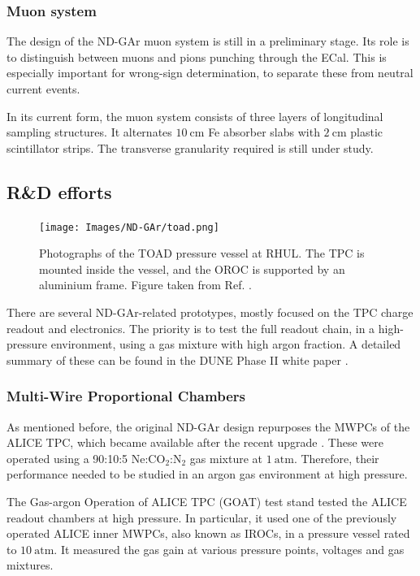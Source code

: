 \subsubsection{Muon system}

The design of the ND-GAr muon system is still in a preliminary stage. Its role is to distinguish between muons and pions punching through the ECal. This is especially important for wrong-sign determination, to separate these from neutral current events.

In its current form, the muon system consists of three layers of longitudinal sampling structures. It alternates $10~\mathrm{cm}$ Fe absorber slabs with $2~\mathrm{cm}$ plastic scintillator strips. The transverse granularity required is still under study.

\subsection{R\&D efforts}

\begin{figure}[t]
	\centering
	\texttt{[image: Images/ND-GAr/toad.png]}
	\caption[Photographs of the TOAD pressure vessel at RHUL.]{Photographs of the TOAD pressure vessel at RHUL. The TPC is mounted inside the vessel, and the OROC is supported by an aluminium frame. Figure taken from Ref. \cite{Ritchie-Yates2023}.}
	\label{fig:toad}
\end{figure}

There are several ND-GAr-related prototypes, mostly focused on the TPC charge readout and electronics. The priority is to test the full readout chain, in a high-pressure environment, using a gas mixture with high argon fraction. A detailed summary of these can be found in the DUNE Phase II white paper \cite{DUNE2024Phase2}.

\subsubsection{Multi-Wire Proportional Chambers}

As mentioned before, the original ND-GAr design repurposes the MWPCs of the ALICE TPC, which became available after the recent upgrade \cite{ALICETPC2020}. These were operated using a 90:10:5 $\mathrm{Ne}$:$\mathrm{CO}_{2}$:$\mathrm{N}_{2}$ gas mixture at $1~\mathrm{atm}$. Therefore, their performance needed to be studied in an argon gas environment at high pressure.

The Gas-argon Operation of ALICE TPC (GOAT) test stand tested the ALICE readout chambers at high pressure. In particular, it used one of the previously operated ALICE inner MWPCs, also known as IROCs, in a pressure vessel rated to $10~\mathrm{atm}$. It measured the gas gain at various pressure points, voltages and gas mixtures.

